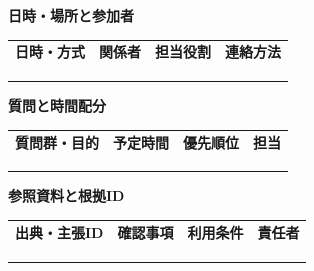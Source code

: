 \documentclass[11pt,a4paper]{article}
\begin{document}
\par{}\noindent\textbf{日時・場所と参加者}\par\vspace{1mm}
{\fontsize{8.5}{13}\selectfont
\begin{tabularx}{\linewidth}{@{}XXXX@{}}
\textbf{日時・方式} & \textbf{関係者} & \textbf{担当役割} & \textbf{連絡方法}\\[2mm]
\strut & \strut & \strut & \strut\\[5mm]
\strut & \strut & \strut & \strut\\[5mm]
\strut & \strut & \strut & \strut\\[5mm]
\end{tabularx}
}\vspace{2mm}\par
{}
\par{}\noindent\textbf{質問と時間配分}\par\vspace{1mm}
{\fontsize{8.5}{13}\selectfont
\begin{tabularx}{\linewidth}{@{}XXXX@{}}
\textbf{質問群・目的} & \textbf{予定時間} & \textbf{優先順位} & \textbf{担当}\\[2mm]
\strut & \strut & \strut & \strut\\[5mm]
\strut & \strut & \strut & \strut\\[5mm]
\strut & \strut & \strut & \strut\\[5mm]
\end{tabularx}
}\vspace{2mm}\par
{}
\par{}\noindent\textbf{参照資料と根拠ID}\par\vspace{1mm}
{\fontsize{8.5}{13}\selectfont
\begin{tabularx}{\linewidth}{@{}XXXX@{}}
\textbf{出典・主張ID} & \textbf{確認事項} & \textbf{利用条件} & \textbf{責任者}\\[2mm]
\strut & \strut & \strut & \strut\\[5mm]
\strut & \strut & \strut & \strut\\[5mm]
\strut & \strut & \strut & \strut\\[5mm]
\end{tabularx}
}\vspace{2mm}\par
\end{document}
